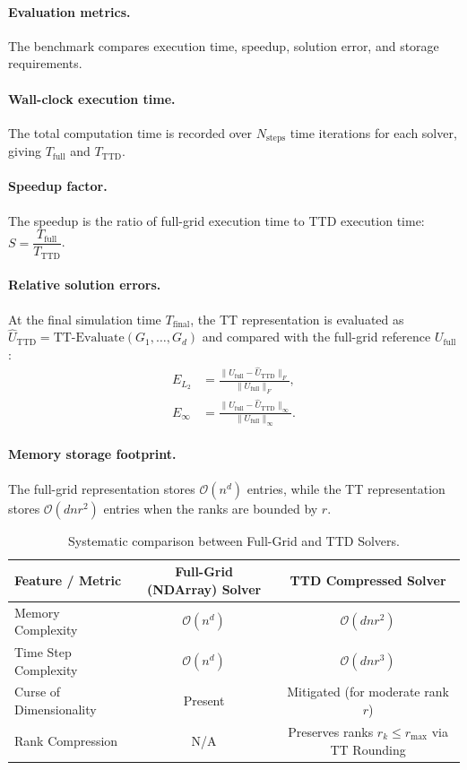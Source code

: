 \documentclass[11pt,a4paper,parskip=half-]{scrartcl}
\theoremstyle{definition}
\theoremstyle{plain}
\theoremstyle{remark}
\begin{document}
\paragraph{Evaluation metrics.}
The benchmark compares execution time, speedup, solution error, and storage
requirements.

\paragraph{Wall-clock execution time.}
The total computation time is recorded over $N_{\text{steps}}$ time iterations
for each solver, giving $T_{\text{full}}$ and $T_{\text{TTD}}$.

\paragraph{Speedup factor.}
The speedup is the ratio of full-grid execution time to TTD execution time:
$S = \dfrac{T_{\text{full}}}{T_{\text{TTD}}}$.

\paragraph{Relative solution errors.}
At the final simulation time $T_{\text{final}}$, the TT representation is
evaluated as $\widehat{U}_{\text{TTD}} = \text{TT-Evaluate}(G_1, \dots, G_d)$
and compared with the full-grid reference $U_{\text{full}}$:
\[
\begin{aligned}
E_{L_2} &= \frac{\|U_{\text{full}} - \widehat{U}_{\text{TTD}}\|_F}
         {\|U_{\text{full}}\|_F}, \\
E_{\infty} &= \frac{\|U_{\text{full}} - \widehat{U}_{\text{TTD}}\|_\infty}
          {\|U_{\text{full}}\|_\infty}.
\end{aligned}
\]

\paragraph{Memory storage footprint.}
The full-grid representation stores $\mathcal{O}(n^d)$ entries, while the TT
representation stores $\mathcal{O}(d n r^2)$ entries when the ranks are bounded
by $r$.

\begin{table}[ht]
\centering
\caption{Systematic comparison between Full-Grid and TTD Solvers.}
\label{tab:solver_comparison}
\begin{tabular}{|l|c|c|}
\hline
\textbf{Feature / Metric} & \textbf{Full-Grid (NDArray) Solver} & \textbf{TTD Compressed Solver} \\ \hline
Memory Complexity & $\mathcal{O}(n^d)$ & $\mathcal{O}(d n r^2)$ \\ \hline
Time Step Complexity & $\mathcal{O}(n^d)$ & $\mathcal{O}(d n r^3)$ \\ \hline
Curse of Dimensionality & Present & Mitigated (for moderate rank $r$) \\ \hline
Rank Compression & N/A & Preserves ranks $r_k \le r_{\max}$ via TT Rounding \\ \hline
\end{tabular}
\end{table}
\end{document}
